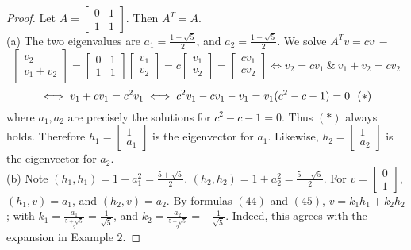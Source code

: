 \documentclass[11pt]{article}
\theoremstyle{quest}
\begin{document}
\begin{proof}
Let $A = \begin{bmatrix} 0 & 1 \\ 1 & 1 \end{bmatrix}$. Then $A^T = A$.
\\(a) The two eigenvalues are $a_1 = \frac{1 + \sqrt{5}}{2}$, and $a_2 = \frac{1 - \sqrt{5}}{2}$. We solve $A^Tv = c v \ -$ $$\begin{bmatrix} v_2 \\ v_1 + v_2 \end{bmatrix} = \begin{bmatrix} 0 & 1 \\ 1 & 1 \end{bmatrix} \begin{bmatrix} v_1 \\ v_2 \end{bmatrix} = c \begin{bmatrix} v_1 \\ v_2 \end{bmatrix} = \begin{bmatrix} c v_1 \\ c v_2 \end{bmatrix} \iff v_2 = c v_1\  \& \ v_1 + v_2 = c v_2$$ $$\iff v_1 + c v_1 = c^2 v_1 \iff c^2 v_1 - c v_1 - v_1 = v_1(c^2 - c - 1) = 0 \\ \ \ (*)$$ where $a_1, a_2$ are precisely the solutions for $c^2 - c - 1 = 0$. Thus $(*)$ always holds. Therefore $h_1 = \begin{bmatrix} 1 \\ a_1 \end{bmatrix}$ is the eigenvector for $a_1$. Likewise, $h_2 = \begin{bmatrix} 1 \\ a_2 \end{bmatrix}$ is the eigenvector for $a_2$.
\\(b) Note $(h_1, h_1) = 1 + a_1^2 = \frac{5+\sqrt{5}}{2}$. $(h_2, h_2) = 1 + a_2^2 = \frac{5-\sqrt{5}}{2}$. For $v = \begin{bmatrix} 0 \\ 1 \end{bmatrix}$, $(h_1, v) = a_1$, and $(h_2, v) = a_2$. By formulas $(44)$ and $(45)$, $v = k_1h_1 + k_2h_2$; with $k_1 = \frac{a_1}{\frac{5 + \sqrt{5}}{2}} = \frac{1}{\sqrt{5}}$, and $k_2 = \frac{a_2}{\frac{5 - \sqrt{5}}{2}} = -\frac{1}{\sqrt{5}}$. Indeed, this agrees with the expansion in Example $2$.
\end{proof}
\end{document}
